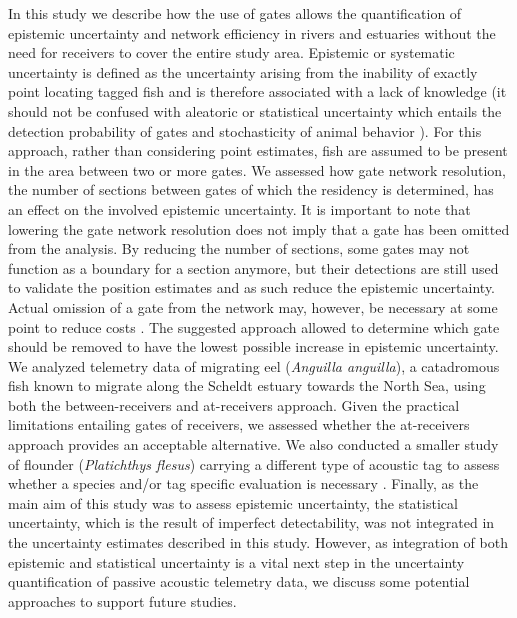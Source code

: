 \documentclass[preprint,12pt,authoryear]{elsarticle}
\begin{document}
\begin{spacing}{1.9}
In this study we describe how the use of gates allows the quantification of epistemic uncertainty and network efficiency in rivers and estuaries without the need for receivers to cover the entire study area. Epistemic or systematic uncertainty is defined as the uncertainty arising from the inability of exactly point locating tagged fish and is therefore associated with a lack of knowledge (it should not be confused with aleatoric or statistical uncertainty which entails the detection probability of gates and stochasticity of animal behavior \citep{Fox2011DistinguishingUncertainty}). For this approach, rather than considering point estimates, fish are assumed to be present in the area between two or more gates. We assessed how gate network resolution, the number of sections between gates of which the residency is determined, has an effect on the involved epistemic uncertainty. It is important to note that lowering the gate network resolution does not imply that a gate has been omitted from the analysis. By reducing the number of sections, some gates may not function as a boundary for a section anymore, but their detections are still used to validate the position estimates and as such reduce the epistemic uncertainty. Actual omission of a gate from the network may, however, be necessary at some point to reduce costs \citep{Brownscombe2019ConductingManagers}. The suggested approach allowed to determine which gate should be removed to have the lowest possible increase in epistemic uncertainty. We analyzed telemetry data of migrating eel (\textit{Anguilla anguilla}), a catadromous fish known to migrate along the Scheldt estuary towards the North Sea, using both the between-receivers and at-receivers approach. Given the practical limitations entailing gates of receivers, we assessed whether the at-receivers approach provides an acceptable alternative. We also conducted a smaller study of flounder (\textit{Platichthys flesus}) carrying a different type of acoustic tag to assess whether a species and/or tag specific evaluation is necessary \citep{Dance2016DoesResearch}. Finally, as the main aim of this study was to assess epistemic uncertainty, the statistical uncertainty, which is the result of imperfect detectability, was not integrated in the uncertainty estimates described in this study. However, as integration of both epistemic and statistical uncertainty is a vital next step in the uncertainty quantification of passive acoustic telemetry data, we discuss some potential approaches to support future studies.


\end{spacing}
\end{document}
